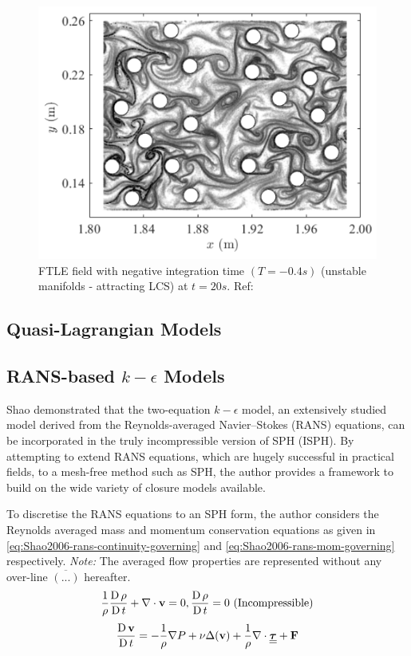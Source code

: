 \begin{figure}[h!]
	\centering
	\includegraphics{Figures/research_papers/Canelas2016-ftle-field.png}
	\caption{FTLE field with negative integration time $(T = -0.4 s)$ (unstable manifolds - attracting LCS) at $t = 20s$. Ref: \parencite{Canelas2016}}
	\label{fig:Canelas2016-ftle-field}
\end{figure}

\subsection{Quasi-Lagrangian Models}

\subsection{RANS-based $k-\epsilon$ Models}

Shao \parencite{Shao2006} demonstrated that the two-equation $k-\epsilon$ model, an extensively studied model derived from the Reynolds-averaged Navier–Stokes (RANS) equations, can be incorporated in the truly incompressible version of SPH (ISPH). By attempting to extend RANS equations, which are hugely successful in practical fields, to a mesh-free method such as SPH, the author provides a framework to build on the wide variety of closure models available.

To discretise the RANS equations to an SPH form, the author considers the Reynolds averaged mass and momentum conservation equations as given in \ref{eq:Shao2006-rans-continuity-governing} and \ref{eq:Shao2006-rans-mom-governing} respectively. \textit{Note:} The averaged flow properties are represented without any over-line $\overline{(...)}$ hereafter.
\begin{equation}
	\frac{1}{\rho} \frac{\operatorname{D} \rho}{\operatorname{D} t} + \nabla \cdot \mathbf{v} = 0, \frac{\operatorname{D} \rho}{\operatorname{D} t} = 0 \text{ (Incompressible)}
	\label{eq:Shao2006-rans-continuity-governing}
\end{equation}
\begin{equation}
	\frac{\operatorname{D} \mathbf{v}}{\operatorname{D} t} = -\frac{1}{\rho}\nabla P + \nu \Delta( \mathbf{v} ) + \frac{1}{\rho} \nabla \cdot \underline{\underline{\bm{\tau}}} + \mathbf{F}
	\label{eq:Shao2006-rans-mom-governing}
\end{equation}

